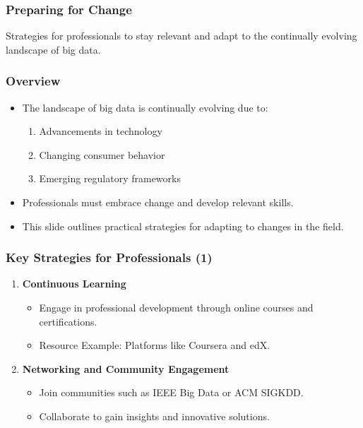 \documentclass[aspectratio=169]{beamer}
\begin{document}
\begin{frame}[fragile]
    \frametitle{Preparing for Change}
    Strategies for professionals to stay relevant and adapt to the continually evolving landscape of big data.
\end{frame}

\begin{frame}[fragile]
    \frametitle{Overview}
    \begin{itemize}
        \item The landscape of big data is continually evolving due to:
        \begin{enumerate}
            \item Advancements in technology
            \item Changing consumer behavior
            \item Emerging regulatory frameworks
        \end{enumerate}
        \item Professionals must embrace change and develop relevant skills.
        \item This slide outlines practical strategies for adapting to changes in the field.
    \end{itemize}
\end{frame}

\begin{frame}[fragile]
    \frametitle{Key Strategies for Professionals (1)}
    \begin{enumerate}
        \item \textbf{Continuous Learning}
        \begin{itemize}
            \item Engage in professional development through online courses and certifications.
            \item Resource Example: Platforms like Coursera and edX.
        \end{itemize}

        \item \textbf{Networking and Community Engagement}
        \begin{itemize}
            \item Join communities such as IEEE Big Data or ACM SIGKDD.
            \item Collaborate to gain insights and innovative solutions.
        \end{itemize}
    \end{enumerate}
\end{frame}
\end{document}

